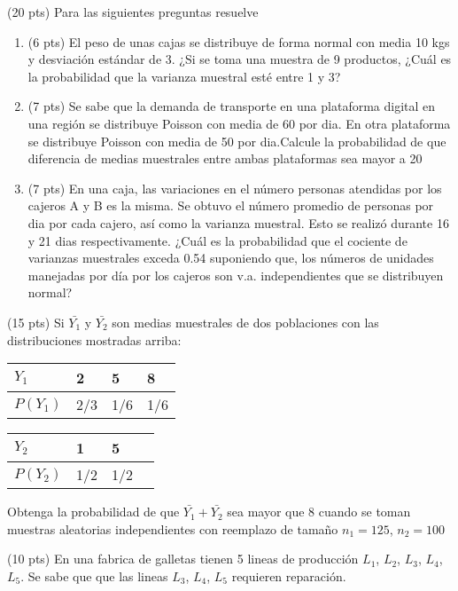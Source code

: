 \documentclass[addpoints]{exam}
\theoremstyle{mytheor}
\begin{document}
  \begin{questions} 

  \question (20 pts)
  Para las siguientes preguntas resuelve 
  \begin{enumerate}
  \item (6 pts) El peso de unas cajas se distribuye de forma normal con media 10 kgs y desviación estándar de 3. ¿Si se toma una muestra de 9 productos, ¿Cuál es la probabilidad que la varianza  muestral esté entre 1 y 3?
  \item (7 pts) Se sabe que la demanda de transporte en una plataforma digital en una región se distribuye Poisson con media de 60 por dia. En otra plataforma se distribuye Poisson con media de 50 por dia.Calcule la probabilidad de que diferencia de medias muestrales entre ambas plataformas sea mayor a 20
  \item (7 pts) En una caja, las variaciones en el número personas atendidas por los cajeros A y B es la misma. Se obtuvo el número promedio de personas por dia por cada cajero, así como la varianza muestral. Esto se realizó durante 16 y 21 dias respectivamente. ¿Cuál es la probabilidad que el cociente de varianzas muestrales exceda 0.54 suponiendo que, los números de unidades manejadas por día por los cajeros son v.a. independientes que se distribuyen normal?
  \end{enumerate}

\question (15 pts) Si $\bar{Y_1}$ y $\bar{Y_2}$ son medias muestrales de dos poblaciones con las distribuciones mostradas arriba:

\begin{table}[h!]
\centering
\begin{tabular}{llll}
$Y_1$ & 2 & 5 & 8 \\ \hline
$P(Y_1)$ & 2/3 & 1/6 & 1/6 
\end{tabular}
\end{table}

\begin{table}[h!]
\centering
\begin{tabular}{llll}
$Y_2$ & 1 & 5 \\ \hline
$P(Y_2)$ & 1/2 & 1/2
\end{tabular}
\end{table}


Obtenga la probabilidad de que $\bar{Y_1} + \bar{Y_2}$ sea mayor que 8 cuando se toman muestras aleatorias independientes con reemplazo de tamaño $n_1 = 125$, $n_2 = 100$


 \question (10 pts) En una fabrica de galletas tienen 5 lineas de producción $L_1$, $L_2$, $L_3$, $L_4$, $L_5$. Se sabe que que las lineas $L_3$, $L_4$, $L_5$ requieren reparación.


\end{questions}
\end{document}
